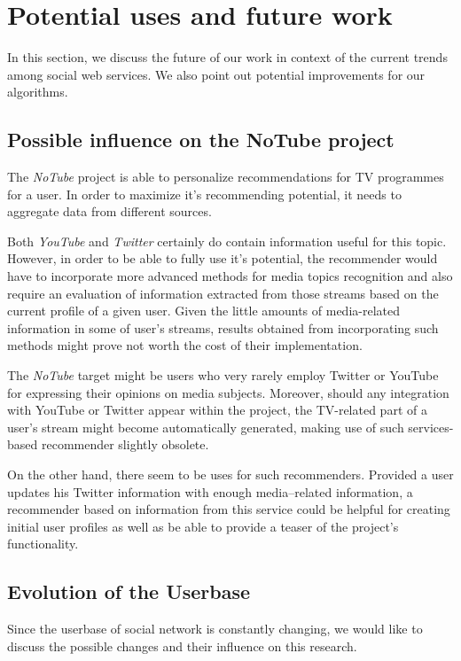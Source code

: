 \section{Potential uses and future work}

In this section, we discuss the future of our work in context of the current
trends among social web services. We also point out potential improvements for
our algorithms.

\subsection{Possible influence on the NoTube project}

The \textit{NoTube} project is able to personalize recommendations for TV
programmes for a user. In order to maximize it's recommending potential, it
needs to aggregate data from different sources.

Both \textit{YouTube} and \textit{Twitter} certainly do contain information
useful for this topic. However, in order to be able to fully use it's
potential, the recommender would have to incorporate more advanced methods for
media topics recognition and also require an evaluation of information
extracted from those streams based on the current profile of a given user.
Given the little amounts of media-related information in some of user's
streams, results obtained from incorporating such methods might prove not worth
the cost of their implementation.

The \textit{NoTube} target might be users who very rarely employ Twitter or
YouTube for expressing their opinions on media subjects. Moreover, should any
integration with YouTube or Twitter appear within the project, the TV-related
part of a user's stream might become automatically generated, making use of
such services-based recommender slightly obsolete.

On the other hand, there seem to be uses for such recommenders. Provided a user
updates his Twitter information with enough media--related information, a
recommender based on information from this service could be helpful for
creating initial user profiles as well as be able to provide a teaser of the
project's functionality.

\subsection{Evolution of the Userbase}

Since the userbase of social network is constantly changing, we would like to
discuss the possible changes and their influence on this research.

